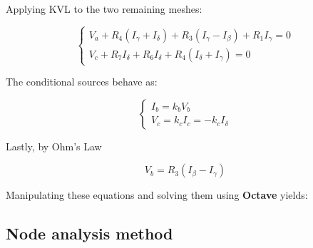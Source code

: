 Applying KVL to the two remaining meshes:

\begin{equation}
  \begin{cases}
    V_a + R_4 (I_\gamma + I_\delta) + R_3 (I_\gamma - I_\beta) + R_1 I_\gamma = 0 \\
    V_c + R_7 I_\delta + R_6 I_\delta + R_4 (I_\delta + I_\gamma) = 0
  \end{cases}
\end{equation}

The conditional sources behave as:

\begin{equation}
  \begin{cases}
  I_b = k_b V_b \\
  V_c = k_c I_c = - k_c I_\delta
  \end{cases}
\end{equation}

Lastly, by Ohm's Law

\begin{equation}
  V_b = R_3 (I_\beta - I_\gamma)
\end{equation}

Manipulating these equations and solving them using {\bf Octave} yields:



\newpage

\subsection{Node analysis method}
\label{sec:node}

